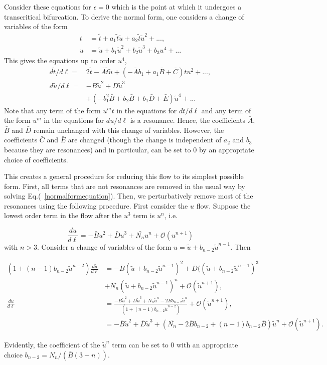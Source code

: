\documentclass[
 reprint,
 amsmath,amssymb,
 aps, superscriptaddress, pre
]{revtex4-1}
\begin{document}
Consider these equations for $\epsilon = 0$ which is the point at which it undergoes a transcritical bifurcation. To derive the normal form, one considers a change of variables of the form 
\begin{align}
 t &= \tilde t + a_1 \tilde t \tilde u + a_2 \tilde t \tilde u^2 + ... , \\
 u &= \tilde u + b_1 \tilde u^2 + b_2 \tilde u^3 + b_3 u^4 + ...
\end{align}
This gives the equations up to order $u^4$, 
\begin{align}
 {d \tilde t}/{d \ell} =& 2 \tilde t -  \bar{A} \tilde t \tilde u + (-\bar{A} b_1 + a_1 \bar{B} + \bar{C}) t u^2 + ... , \\
 {d \tilde u}/{d \ell} =& - \bar{B} \tilde{u}^2 + \bar{D} \tilde{u}^3 \nonumber \\ &+ (-b_1^2 \bar{B} + b_2 \bar{B} + b_1 \bar{D} + \bar{E}) \tilde{u}^4 + ...
\end{align}
Note that any term of the form $u^m t$ in the equations for $d t/d \ell$ and any term of the form $u^m$ in the equations for $d u/d \ell$ is a resonance. Hence, the coefficients $\bar{A}$, $\bar{B}$ and $\bar{D}$ remain unchanged with this change of variables. However, the coefficients $\bar{C}$ and $\bar{E}$ are changed (though the change is independent of $a_2$ and $b_3$ because they are resonances) and in particular, can be set to 0 by an appropriate choice of coefficients. 

This creates a general procedure for reducing this flow to its simplest possible form. First, all terms that are not resonances are removed in the usual way by solving Eq.(~\ref{normalformequation}). Then, we perturbatively remove most of the resonances using the following procedure. First consider the $u$ flow. Suppose the lowest order term in the flow after the $u^3$ term is $u^n$, i.e.

\begin{equation}
 \frac{d u}{d \ell} = - \bar{B} u^2 + \bar{D} u^3 + \bar{N_n} u^n + \mathcal{O}(u^{n+1})
\end{equation}
with $n > 3$. Consider a change of variables of the form $u = \tilde{u} + b_{n-2} \tilde{u}^{n-1}$. Then
\begin{widetext}
\begin{align}
 (1 + (n-1) b_{n-2} \tilde{u}^{n-2}) \frac{d \tilde u}{d \ell} &= - \bar{B} (\tilde{u} + b_{n-2} \tilde{u}^{n-1})^2 + \bar{D} ((\tilde{u} + b_{n-2} \tilde{u}^{n-1})^3 \nonumber \\ &+ \bar{N_n} (\tilde{u} + b_{n-2} \tilde{u}^{n-1})^n + \mathcal{O}(\tilde{u}^{n+1}) , \\
 \frac{d \tilde u}{d \ell} &= \frac{- \bar{B} \tilde{u}^2 + \bar{D} \tilde{u}^3 + \bar{N_n} \tilde{u}^n - 2 \bar{B} b_{n-2} \tilde{u}^n}{(1 + (n-1) b_{n-2} \tilde{u}^{n-2}) } + \mathcal{O}(\tilde{u}^{n+1}) , \\
 &= - \bar{B} \tilde{u}^2 + \bar{D} \tilde{u}^3 + (\bar{N_n} - 2 \bar{B} b_{n-2} + (n-1) b_{n-2} \bar{B}) \tilde{u}^n + \mathcal{O}(\tilde{u}^{n+1}) .
\end{align}
\end{widetext}
Evidently, the coefficient of the $\tilde{u}^n$ term can be set to 0 with an appropriate choice  $b_{n-2} = N_n/(\bar{B} (3 - n))$.
\end{document}
